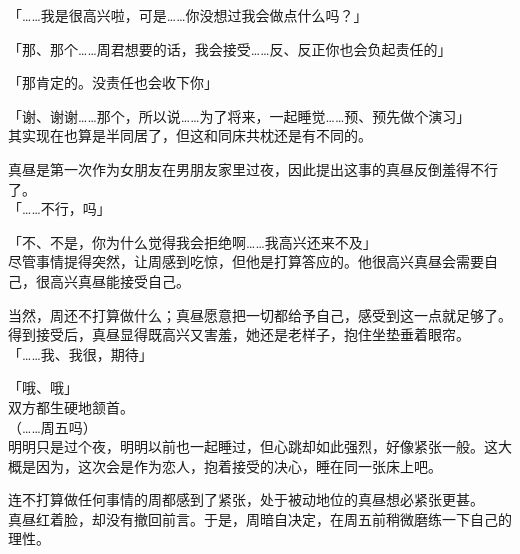 「……我是很高兴啦，可是……你没想过我会做点什么吗？」

「那、那个……周君想要的话，我会接受……反、反正你也会负起责任的」

「那肯定的。没责任也会收下你」

「谢、谢谢……那个，所以说……为了将来，一起睡觉……预、预先做个演习」\\

其实现在也算是半同居了，但这和同床共枕还是有不同的。

真昼是第一次作为女朋友在男朋友家里过夜，因此提出这事的真昼反倒羞得不行了。\\

「……不行，吗」

「不、不是，你为什么觉得我会拒绝啊……我高兴还来不及」\\

尽管事情提得突然，让周感到吃惊，但他是打算答应的。他很高兴真昼会需要自己，很高兴真昼能接受自己。

当然，周还不打算做什么；真昼愿意把一切都给予自己，感受到这一点就足够了。\\

得到接受后，真昼显得既高兴又害羞，她还是老样子，抱住坐垫垂着眼帘。\\

「……我、我很，期待」

「哦、哦」\\

双方都生硬地颔首。\\

（……周五吗）\\

明明只是过个夜，明明以前也一起睡过，但心跳却如此强烈，好像紧张一般。这大概是因为，这次会是作为恋人，抱着接受的决心，睡在同一张床上吧。

连不打算做任何事情的周都感到了紧张，处于被动地位的真昼想必紧张更甚。\\

真昼红着脸，却没有撤回前言。于是，周暗自决定，在周五前稍微磨练一下自己的理性。

